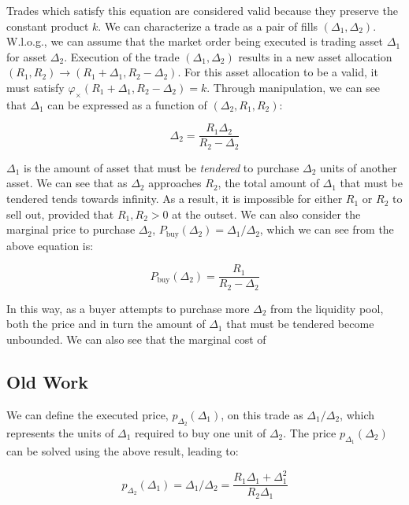 \documentclass{article}
\begin{document}
 Trades which satisfy this equation are considered valid because they preserve the constant product $k$. We can characterize a trade as a pair of fills $(\Delta_1, \Delta_2)$. W.l.o.g., we can assume that the market order being executed is trading asset $\Delta_1$ for asset $\Delta_2$. Execution of the trade $(\Delta_1, \Delta_2)$ results in a new asset allocation $(R_1, R_2) \rightarrow (R_1 + \Delta_1, R_2 - \Delta_2)$. For this asset allocation to be a valid, it must satisfy $\varphi_{\times}(R_1 + \Delta_1, R_2 - \Delta_2) = k$. Through manipulation, we can see that $\Delta_1$ can be expressed as a function of $(\Delta_2, R_1, R_2)$:

\begin{equation}
\label{eq:cppm_sol}
\Delta_2 = \frac{R_1 \Delta_2}{R_2 - \Delta_2}
\end{equation}

$\Delta_1$ is the amount of asset that must be \emph{tendered} to purchase $\Delta_2$ units of another asset. We can see that as $\Delta_2$ approaches $R_2$, the total amount of $\Delta_1$ that must be tendered tends towards infinity. As a result, it is impossible for either $R_1$ or $R_2$ to sell out, provided that $R_1, R_2 > 0$ at the outset. We can also consider the marginal price to purchase $\Delta_2$, $P_{\mathrm{buy}}(\Delta_2) = \Delta_1 / \Delta_2$, which we can see from the above equation is:

\begin{equation}
\label{eq:cppm_price_sol}
P_{\mathrm{buy}}(\Delta_2) = \frac{R_1}{R_2 - \Delta_2}
\end{equation}

In this way, as a buyer attempts to purchase more $\Delta_2$ from the liquidity pool, both the price and in turn the amount of $\Delta_1$ that must be tendered become unbounded. We can also see that the marginal cost of 

\subsection{Old Work}
\label{sec:old}

We can define the executed price, $p_{\Delta_2}(\Delta_1)$, on this trade as $\Delta_1 / \Delta_2$, which represents the units of $\Delta_1$ required to buy one unit of $\Delta_2$. The price $p_{\Delta_1}(\Delta_2)$ can be solved using the above result, leading to:

\begin{equation}
\label{eq:cppm_price}
p_{\Delta_2}(\Delta_1) = \Delta_1 / \Delta_2 = \frac{R_1 \Delta_1 + \Delta_1^{2}}{R_2 \Delta_1}
\end{equation}
\end{document}
